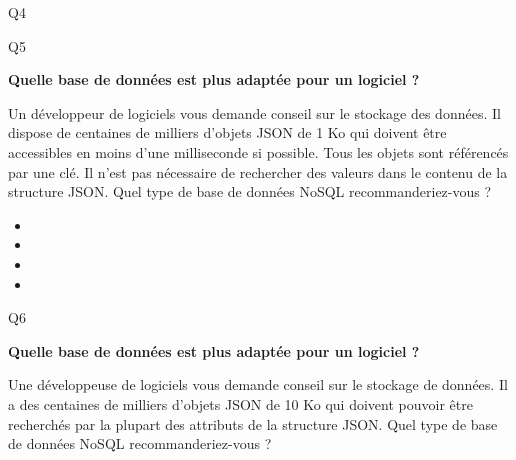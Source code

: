 {\begin{frame}{Q4}

    \end{frame}

    \begin{frame}{Q5}

        \textbf{Quelle base de données est plus adaptée pour un logiciel ?}

        Un développeur de logiciels vous demande conseil sur le stockage des
        données. Il dispose de centaines de milliers d'objets JSON de 1 Ko qui
        doivent être accessibles en moins d'une milliseconde si possible. Tous
        les objets sont référencés par une clé. Il n'est pas nécessaire de
        rechercher des valeurs dans le contenu de la structure JSON. Quel type
        de base de données NoSQL recommanderiez-vous ?

        \begin{itemize}
            \item {}
            \item {}
            \item {}
            \item \quizanswer{\textcolor{kh-yellow}{Base de données clé-valeur}}
        \end{itemize}


    \end{frame}

    \begin{frame}{Q6}

        \textbf{Quelle base de données est plus adaptée pour un logiciel ?}

        Une développeuse de logiciels vous demande conseil sur le stockage de
        données. Il a des centaines de milliers d'objets JSON de 10 Ko qui
        doivent pouvoir être recherchés par la plupart des attributs de la
        structure JSON. Quel type de base de données NoSQL recommanderiez-vous ?


\end{frame}}
